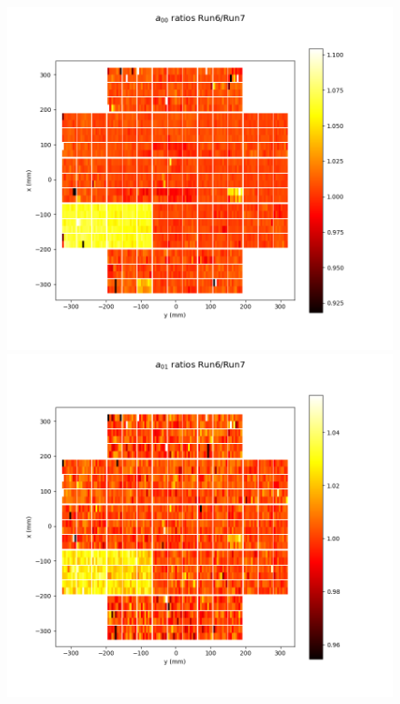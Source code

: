 \begin{figure}[ht]
  \begin{centering}
  \includegraphics[width=\linewidth]{figures/baselineCharacterization/a00_ratios.png}
  \endminipage\hfill
  \includegraphics[width=\linewidth]{figures/baselineCharacterization/a01_ratios.png}
  \endminipage\hfill

\end{centering}
\end{figure}
